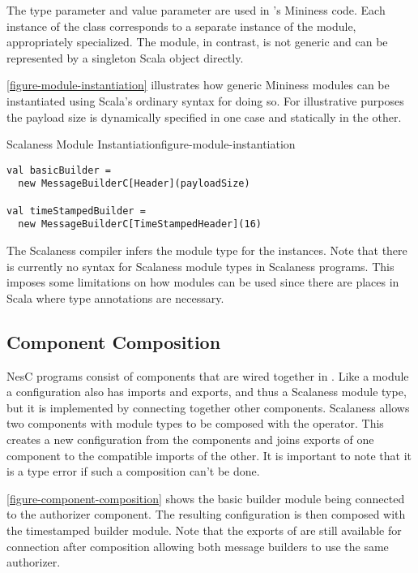 The  type parameter and  value
parameter are used in 's Mininess code. Each
instance of the class corresponds to a separate instance of the
module, appropriately specialized. The  module, in
contrast, is not generic and can be represented by a singleton Scala
object directly.

\autoref{figure-module-instantiation} illustrates how generic Mininess
modules can be instantiated using Scala's ordinary syntax for doing
so. For illustrative purposes the payload size is dynamically
specified in one case and statically in the other.

\begin{fpfig}[tbhp]{Scalaness Module Instantiation}{figure-module-instantiation}
{
\begin{Verbatim}[fontsize=\small]
val basicBuilder =
  new MessageBuilderC[Header](payloadSize)

val timeStampedBuilder =
  new MessageBuilderC[TimeStampedHeader](16)
\end{Verbatim}
}
\end{fpfig}

The Scalaness compiler infers the module type for the instances. Note
that there is currently no syntax for Scalaness module types in
Scalaness programs. This imposes some limitations on how modules can
be used since there are places in Scala where type annotations are
necessary.

\subsection{Component Composition}
\label{section-component-composition}

NesC programs consist of components that are wired together in
. Like a module a configuration also has
imports and exports, and thus a Scalaness module type, but it is
implemented by connecting together other components. Scalaness allows
two components with module types to be composed with the \code{+}
operator. This creates a new configuration from the components and
joins exports of one component to the compatible imports of the other.
It is important to note that it is a type error if such a composition
can't be done.

\autoref{figure-component-composition} shows the basic builder module
being connected to the authorizer component. The resulting
configuration is then composed with the timestamped builder module.
Note that the exports of  are still available for
connection after composition allowing both message builders to use the
same authorizer.

